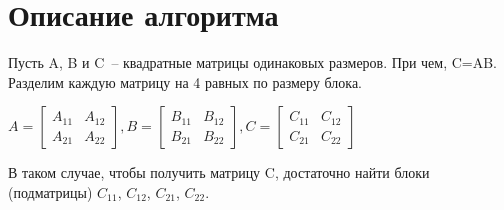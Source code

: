 \documentclass{report}
\begin{document}
\section{Описание алгоритма}
\par Пусть A, B и C~-- квадратные матрицы одинаковых размеров. При чем, C=AB. Разделим каждую матрицу на 4 равных по размеру блока.
\begin{center}
$A=\begin{bmatrix}
A_{11} & A_{12}\\
A_{21} & A_{22}
\end{bmatrix},
B=\begin{bmatrix}
B_{11} & B_{12}\\
B_{21} & B_{22}
\end{bmatrix},
C=\begin{bmatrix}
C_{11} & C_{12}\\
C_{21} & C_{22}
\end{bmatrix}$
\end{center}
\par В таком случае, чтобы получить матрицу C, достаточно найти блоки (подматрицы) $C_{11}$, $C_{12}$, $C_{21}$, $C_{22}$.
\end{document}
